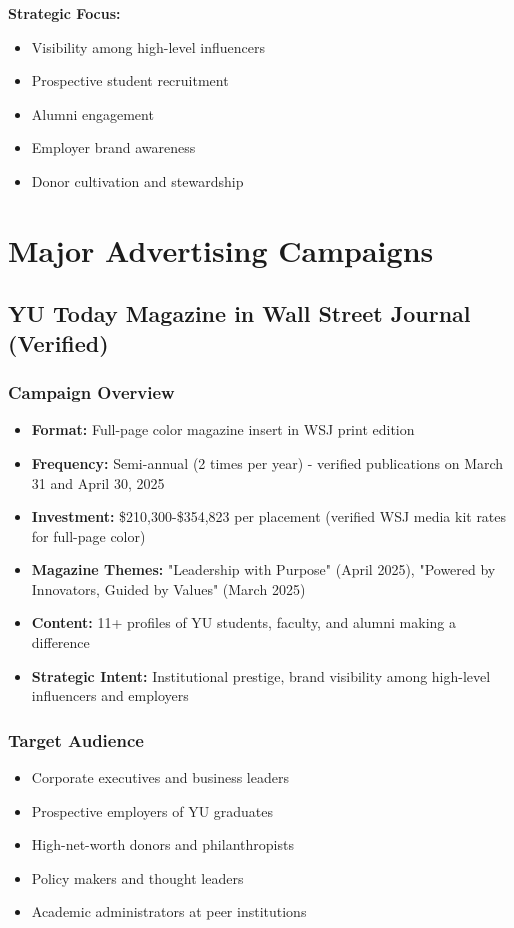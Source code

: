 \documentclass[12pt,letterpaper]{article}
\begin{document}
\textbf{Strategic Focus:}
\begin{itemize}[leftmargin=*]
    \item Visibility among high-level influencers
    \item Prospective student recruitment
    \item Alumni engagement
    \item Employer brand awareness
    \item Donor cultivation and stewardship
\end{itemize}

\section{Major Advertising Campaigns}

\subsection{YU Today Magazine in Wall Street Journal (Verified)}

\subsubsection{Campaign Overview}
\begin{itemize}[leftmargin=*]
    \item \textbf{Format:} Full-page color magazine insert in WSJ print edition
    \item \textbf{Frequency:} Semi-annual (2 times per year) - verified publications on March 31 and April 30, 2025
    \item \textbf{Investment:} \$210,300-\$354,823 per placement (verified WSJ media kit rates for full-page color)
    \item \textbf{Magazine Themes:} "Leadership with Purpose" (April 2025), "Powered by Innovators, Guided by Values" (March 2025)
    \item \textbf{Content:} 11+ profiles of YU students, faculty, and alumni making a difference
    \item \textbf{Strategic Intent:} Institutional prestige, brand visibility among high-level influencers and employers
\end{itemize}

\subsubsection{Target Audience}
\begin{itemize}[leftmargin=*]
    \item Corporate executives and business leaders
    \item Prospective employers of YU graduates
    \item High-net-worth donors and philanthropists
    \item Policy makers and thought leaders
    \item Academic administrators at peer institutions
\end{itemize}
\end{document}
